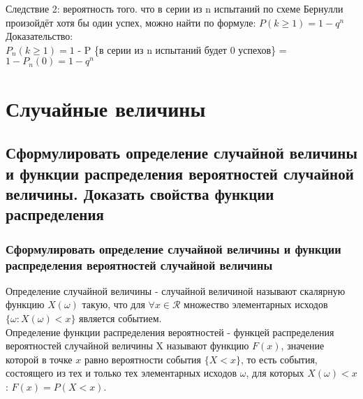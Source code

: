 Следствие 2: вероятность того. что в серии из n испытаний по схеме Бернулли произойдёт хотя бы один успех, можно найти по формуле: $P(k \geqslant 1) = 1 - q^{n}$\\
Доказательство:\\
$P_{n}(k \geqslant 1) = 1$ - P \{в серии из n испытаний будет 0 успехов\} = $1 - P_{n}(0) = 1 - q^{n}$\\

\chapter{Случайные величины}
\section{Сформулировать определение случайной величины и функции распределения вероятностей случайной величины. Доказать свойства функции распределения}
\subsection{Сформулировать определение случайной величины и функции распределения вероятностей случайной величины}
Определение случайной величины - случайной величиной называют скалярную функцию $X(\omega)$ такую, что для $\forall x \in \mathcal{R}$ множество элементарных исходов $\{ \omega : X(\omega) < x \}$ является событием.\\

Определение функции распределения вероятностей - функцей распределения вероятностей случайной величины X называют функцию $F(x)$, значение которой в точке $x$ равно вероятности события $\{X < x\}$, то есть события, состоящего из тех и только тех элементарных исходов $\omega$, для которых $X(\omega) < x$: $F(x) = P(X < x)$.\\


